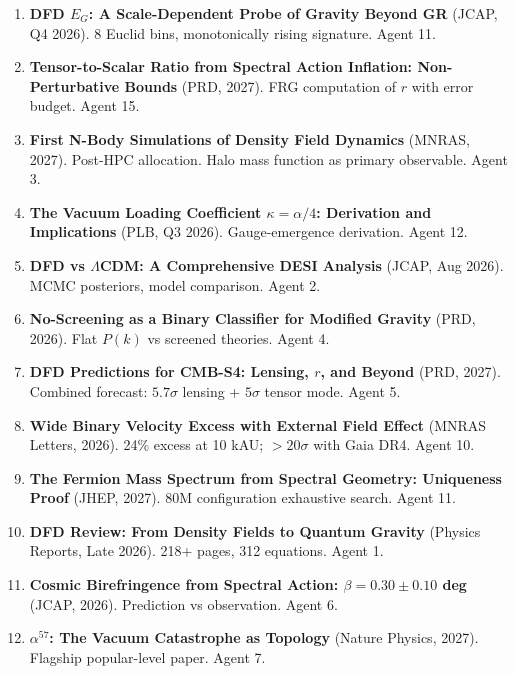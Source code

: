 \documentclass[11pt,a4paper]{article}
\begin{document}
\begin{enumerate}[nosep]
\item \textbf{DFD $E_G$: A Scale-Dependent Probe of Gravity Beyond GR} (JCAP, Q4 2026). 8 Euclid bins, monotonically rising signature. Agent 11.

\item \textbf{Tensor-to-Scalar Ratio from Spectral Action Inflation: Non-Perturbative Bounds} (PRD, 2027). FRG computation of $r$ with error budget. Agent 15.

\item \textbf{First N-Body Simulations of Density Field Dynamics} (MNRAS, 2027). Post-HPC allocation. Halo mass function as primary observable. Agent 3.

\item \textbf{The Vacuum Loading Coefficient $\kappa = \alpha/4$: Derivation and Implications} (PLB, Q3 2026). Gauge-emergence derivation. Agent 12.

\item \textbf{DFD vs $\Lambda$CDM: A Comprehensive DESI Analysis} (JCAP, Aug 2026). MCMC posteriors, model comparison. Agent 2.

\item \textbf{No-Screening as a Binary Classifier for Modified Gravity} (PRD, 2026). Flat $P(k)$ vs screened theories. Agent 4.

\item \textbf{DFD Predictions for CMB-S4: Lensing, $r$, and Beyond} (PRD, 2027). Combined forecast: $5.7\sigma$ lensing + $5\sigma$ tensor mode. Agent 5.

\item \textbf{Wide Binary Velocity Excess with External Field Effect} (MNRAS Letters, 2026). 24\% excess at 10 kAU; $>20\sigma$ with Gaia DR4. Agent 10.

\item \textbf{The Fermion Mass Spectrum from Spectral Geometry: Uniqueness Proof} (JHEP, 2027). 80M configuration exhaustive search. Agent 11.

\item \textbf{DFD Review: From Density Fields to Quantum Gravity} (Physics Reports, Late 2026). 218+ pages, 312 equations. Agent 1.

\item \textbf{Cosmic Birefringence from Spectral Action: $\beta = 0.30 \pm 0.10$ deg} (JCAP, 2026). Prediction vs observation. Agent 6.

\item \textbf{$\alpha^{57}$: The Vacuum Catastrophe as Topology} (Nature Physics, 2027). Flagship popular-level paper. Agent 7.


\end{enumerate}
\end{document}
